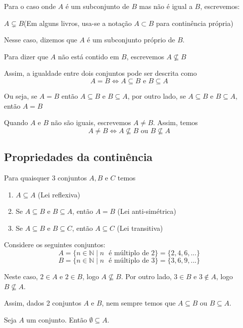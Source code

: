Para o caso onde $A$ {\'e} um subconjunto de $B$ mas n{\~a}o {\'e} igual a $B$, escrevemos:
\begin{center}
$A \subsetneq B$(Em alguns livros, usa-se a nota{\c c}{\~a}o $A \subset B$ para contin{\^e}ncia pr{\'o}pria)
\end{center}

Nesse caso, dizemos que $A$ {\'e} um subconjunto pr{\'o}prio de $B$.

Para dizer que $A$ n{\~a}o est{\'a} contido em $B$, escrevemos $A \nsubseteq B$

Assim, a igualdade entre dois conjuntos pode ser descrita como
\[ A = B \Leftrightarrow A \subseteq B \mbox{ e } B \subseteq A\]

Ou seja, se $A = B$ ent{\~a}o $A \subseteq B$ e $B \subseteq A$, por outro lado, se $A \subseteq B$ e $B \subseteq A$, ent{\~a}o $A = B$

Quando $A$ e $B$ n{\~a}o s{\~a}o iguais, escrevemos $A \neq B$. Assim, temos
\[ A \neq B \Leftrightarrow A \nsubseteq B \mbox{ ou } B \nsubseteq A\]

\subsection{Propriedades da contin{\^e}ncia}
Para quaisquer 3 conjuntos $A,B$ e $C$ temos
\begin{enumerate}
\item $A\subseteq A$ (Lei reflexiva)
\item Se $A\subseteq B \mbox{ e } B\subseteq A$, ent{\~a}o $A=B$ (Lei anti-sim{\'e}trica)
\item Se $A\subseteq B$ e $B\subseteq C$, ent{\~a}o $A\subseteq C$ (Lei transitiva)
\end{enumerate}

Considere os seguintes conjuntos:
\[A = \{ n \in \mathbb{N} \mid n \mbox{ {\'e} m{\'u}ltiplo de } 2\}=\{2,4,6,...\}\]
\[ B = \{n\in\mathbb{N} \mid n \mbox{ {\'e} m{\'u}ltiplo de } 3\}=\{3,6,9,...\}\]

Neste caso, $2 \in A$ e $2 \in B$, logo $A \nsubseteq B$. Por outro lado, $3 \in B$ e $3 \notin A$, logo $B \nsubseteq A$.

Assim, dados 2 conjuntos $A$ e $B$, nem sempre temos que $A \subseteq B$ ou $B \subseteq A$.

\begin{proposicao} Seja $A$ um conjunto. Ent{\~a}o $ \emptyset \subseteq A$.\end{proposicao}

